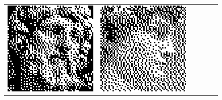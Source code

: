 \begin{figure}
\begin{tabular}{c c c c c c}
		\includegraphics[width=\tilewidth,interpolate=false]{media/chp2/associative_memory/binam/04_02_out_scaled_crushed.png}&%
		\includegraphics[width=\tilewidth,interpolate=false]{media/chp2/associative_memory/binam/05_00_orig_scaled_crushed.png}&%

\end{tabular}
\end{figure}
